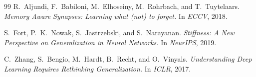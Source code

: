 \documentclass[11pt,a4paper]{article}
\begin{document}
\begin{thebibliography}{99}
R.\ Aljundi, F.\ Babiloni, M.\ Elhoseiny, M.\ Rohrbach, and T.\ Tuytelaars.
\textit{Memory Aware Synapses: Learning what (not) to forget.}
In \emph{ECCV}, 2018.

S.\ Fort, P.\ K.\ Nowak, S.\ Jastrzebski, and S.\ Narayanan.
\textit{Stiffness: A New Perspective on Generalization in Neural Networks.}
In \emph{NeurIPS}, 2019.

C.\ Zhang, S.\ Bengio, M.\ Hardt, B.\ Recht, and O.\ Vinyals.
\textit{Understanding Deep Learning Requires Rethinking Generalization.}
In \emph{ICLR}, 2017.

\end{thebibliography}
\end{document}
